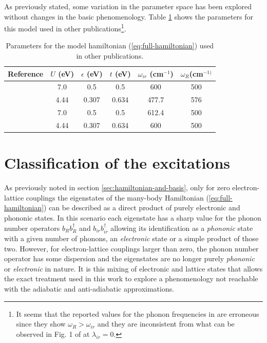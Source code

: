 As previously stated, some variation in the parameter space has been explored without changes in the basic phenomenology. Table \ref{tab:parameters} shows the parameters for this model used in other publications\footnote{It seems that the reported values for the phonon frequencies in \cite{Salkola1994, Salkola1995} are erroneous since they show $\omega_R > \omega_{ir}$ and they are inconsistent from what can be observed in Fig. 1 of \cite{Salkola1994} at $\lambda_{ir}=0$.}.

\begin{table}[h]
  \centering
  \begin{tabular}[h]{| l | c | c | c | c | c |}
    \hline
    Reference & $U$ (eV) & $\epsilon$ (eV) & $t$ (eV) & $\omega_{ir}$ (cm$^{-1}$) & $\omega_R$(cm$^{-1)}$ \\
    \hline
    \cite{MustredeLeon1992} & 7.0 & 0.5 & 0.5 & 600 & 500 \\ 
    \cite{Salkola1994, Salkola1995} & 4.44 & 0.307 & 0.634 & 477.7 & 576  \\
    \cite{DeLeon1999, Leon2008, MirandaMena2007,Mena2006} & 7.0 & 0.5 & 0.5 & 612.4 & 500 \\ 
    \cite{MustredeLeon2000} & 4.44 & 0.307 & 0.634 & 600 & 500 \\
    \hline
  \end{tabular}
  \caption{Parameters for the model hamiltonian (\ref{eq:full-hamiltonian}) used in other publications.}
  \label{tab:parameters}
\end{table}

\section{Classification of the excitations}
\label{sec:classification}

As previously noted in section \ref{sec:hamiltonian-and-basis}, only for zero electron-lattice couplings the eigenstates of the many-body Hamiltonian (\ref{eq:full-hamiltonian}) can be described as a direct product of purely electronic and phononic states. 
In this scenario each eigenstate has a sharp value for the phonon number operators $b_Rb^\dagger_R$ and $b_{ir}b^\dagger_{ir}$ allowing its identification as a \textit{phononic} state with a given number of phonons, an \textit{electronic} state or a simple product of those two.
However, for electron-lattice couplings larger than zero, the phonon number operator has some dispersion and the eigenstates are no longer purely \textit{phononic} or \textit{electronic} in nature.
It is this mixing of electronic and lattice states that allows the exact treatment used in this work to explore a phenomenology not reachable with the adiabatic and anti-adiabatic approximations.

